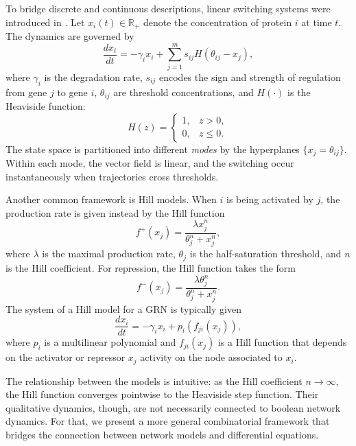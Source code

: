 \documentclass[11pt]{article}
\begin{document}
To bridge discrete and continuous descriptions, linear switching systems were introduced in \cite{glass1973,glass1975}. Let $x_i(t) \in \mathbb{R}_+$ denote the concentration of protein $i$ at time $t$. The dynamics are governed by
\begin{equation}
  \frac{dx_i}{dt} = -\gamma_i x_i + \sum_{j=1}^m s_{ij} H(\theta_{ij} - x_j),
  \label{eq:glass}
\end{equation}
where $\gamma_i$ is the degradation rate, $s_{ij}$ encodes the sign and strength of regulation from gene $j$ to gene $i$, $\theta_{ij}$ are threshold concentrations, and $H(\cdot)$ is the Heaviside function:
\begin{equation}
  H(z) =
  \begin{cases} 1, & z > 0, \\ 0, & z \leq 0.
  \end{cases}
\end{equation}
The state space is partitioned into different \emph{modes} by the hyperplanes $\{x_j = \theta_{ij}\}$. Within each mode, the vector field is linear, and the switching occur instantaneously when trajectories cross thresholds.

Another common framework is Hill models. When $i$ is being activated by $j$, the production rate is given instead by the Hill function
\begin{equation}
  f^+(x_j) = \frac{\lambda x_j^n}{\theta_j^n + x_j^n},
\end{equation}
where $\lambda$ is the maximal production rate, $\theta_j$ is the half-saturation threshold, and $n$ is the Hill coefficient. For repression, the Hill function takes the form
\begin{equation}
  f^-(x_j) = \frac{\lambda \theta_j^n}{\theta_j^n + x_j^n}.
\end{equation}
The system of a Hill model for a GRN is typically given 
\begin{equation}
  \frac{dx_i}{dt} = -\gamma_i x_i + p_i\left(f_{ji}(x_j) \right),
  \label{eq:hill}
\end{equation}
where $p_i$ is a multilinear polynomial and $f_{ji}(x_j)$ is a Hill function that depends on the activator or repressor $x_j$ activity on the node associated to $x_i$. 

The relationship between the models is intuitive: as the Hill coefficient $n \to \infty$, the Hill function converges pointwise to the Heaviside step function. Their qualitative dynamics, though, are not necessarily connected to boolean network dynamics. For that, we present a more general combinatorial framework that bridges the connection between network models and differential equations.
\end{document}
